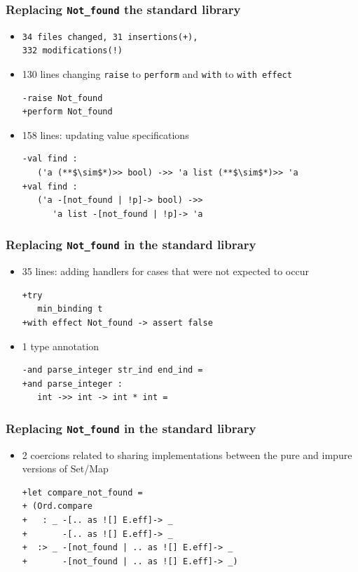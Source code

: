 \documentclass{beamer}
\begin{document}
\begin{frame}[fragile]
\frametitle{Replacing \texttt{Not\_found} the standard library}
\begin{itemize}
\item
\begin{verbatim}
34 files changed, 31 insertions(+),
332 modifications(!)
\end{verbatim}
\item 130 lines changing \lstinline[style=ocaml]{raise} to
  \lstinline[style=ocaml]{perform} and \lstinline[style=ocaml]{with} to
  \lstinline[style=ocaml]{with effect}
\begin{lstlisting}[style=ocaml]
-raise Not_found
+perform Not_found
\end{lstlisting}
\item 158 lines: updating value specifications
\begin{lstlisting}[style=ocaml]
-val find :
   ('a (**$\sim$*)>> bool) ->> 'a list (**$\sim$*)>> 'a
+val find :
   ('a -[not_found | !p]-> bool) ->>
      'a list -[not_found | !p]-> 'a
\end{lstlisting}
\end{itemize}
\end{frame}

\begin{frame}[fragile]
\frametitle{Replacing \texttt{Not\_found} in the standard library}
\begin{itemize}
\item 35 lines: adding handlers for cases that were not expected to occur
\begin{lstlisting}[style=ocaml]
+try
   min_binding t
+with effect Not_found -> assert false
\end{lstlisting}
\item 1 type annotation
\begin{lstlisting}[style=ocaml]
-and parse_integer str_ind end_ind =
+and parse_integer :
   int ->> int -> int * int =
\end{lstlisting}
\end{itemize}
\end{frame}

\begin{frame}[fragile]
\frametitle{Replacing \texttt{Not\_found} in the standard library}
\begin{itemize}
\item 2 coercions related to sharing implementations between the pure
  and impure versions of Set/Map
\begin{lstlisting}[style=ocaml]
+let compare_not_found =
+ (Ord.compare
+   : _ -[.. as ![] E.eff]-> _
+       -[.. as ![] E.eff]-> _
+  :> _ -[not_found | .. as ![] E.eff]-> _
+       -[not_found | .. as ![] E.eff]-> _)
\end{lstlisting}
\end{itemize}
\end{frame}
\end{document}
